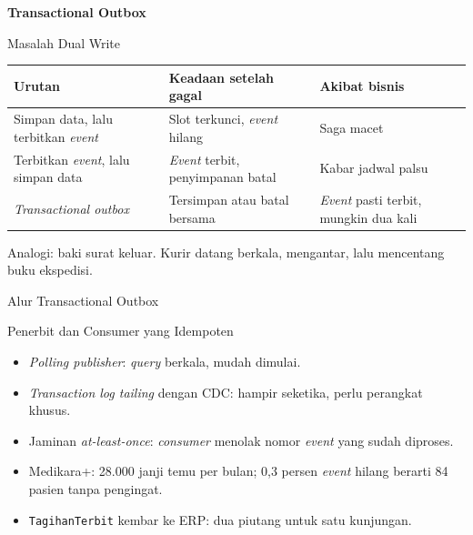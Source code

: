 \documentclass[aspectratio=169, table, 12pt]{beamer}
\begin{document}
\begin{frame}{\hfill}
  \centering
  \Huge{\textbf{Transactional Outbox}}
\end{frame}

\begin{frame}{{\Large Masalah Dual Write}}
  \footnotesize
  \begin{tabularx}{\textwidth}{>{\raggedright\arraybackslash}p{3.6cm}
      >{\raggedright\arraybackslash}X >{\raggedright\arraybackslash}X}
    \hline
    \textbf{Urutan} & \textbf{Keadaan setelah gagal} & \textbf{Akibat bisnis} \\
    \hline
    Simpan data, lalu terbitkan \textit{event} & Slot terkunci, \textit{event}
      hilang & Saga macet \\
    \hline
    Terbitkan \textit{event}, lalu simpan data & \textit{Event} terbit,
      penyimpanan batal & Kabar jadwal palsu \\
    \hline
    \textit{Transactional outbox} & Tersimpan atau batal bersama &
      \textit{Event} pasti terbit, mungkin dua kali \\
    \hline
  \end{tabularx}

  \vspace{10pt}
  \small
  Analogi: baki surat keluar. Kurir datang berkala, mengantar, lalu mencentang
  buku ekspedisi.
\end{frame}

\begin{frame}{{\Large Alur Transactional Outbox}}
  \centering
\end{frame}

\begin{frame}{{\Large Penerbit dan Consumer yang Idempoten}}
  \vspace{6pt}
  \small
  \begin{itemize}
    \item \textit{Polling publisher}: \textit{query} berkala, mudah dimulai.
    \item \textit{Transaction log tailing} dengan CDC: hampir seketika, perlu
          perangkat khusus.
    \item Jaminan \textit{at-least-once}: \textit{consumer} menolak nomor
          \textit{event} yang sudah diproses.
    \item Medikara+: 28.000 janji temu per bulan; 0,3 persen \textit{event}
          hilang berarti 84 pasien tanpa pengingat.
    \item \texttt{TagihanTerbit} kembar ke ERP: dua piutang untuk satu
          kunjungan.
  \end{itemize}
\end{frame}
\end{document}

